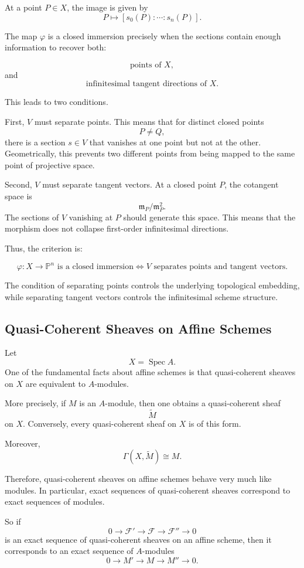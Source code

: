 \documentclass[12pt,a4paper]{article}
\theoremstyle{notespace}
\begin{document}
At a point \(P\in X\), the image is given by
\[
P\mapsto [s_0(P):\cdots:s_n(P)].
\]

The map \(\varphi\) is a closed immersion precisely when the sections contain enough information to recover both:

\[
\text{points of }X,
\]
and
\[
\text{infinitesimal tangent directions of }X.
\]

This leads to two conditions.

First, \(V\) must separate points. This means that for distinct closed points
\[
P\neq Q,
\]
there is a section \(s\in V\) that vanishes at one point but not at the other. Geometrically, this prevents two different points from being mapped to the same point of projective space.

Second, \(V\) must separate tangent vectors. At a closed point \(P\), the cotangent space is
\[
\mathfrak m_P/\mathfrak m_P^2.
\]
The sections of \(V\) vanishing at \(P\) should generate this space. This means that the morphism does not collapse first-order infinitesimal directions.

Thus, the criterion is:

\[
\boxed{
	\varphi:X\to \mathbb P^n
	\text{ is a closed immersion}
	\iff
	V \text{ separates points and tangent vectors.}
}
\]

The condition of separating points controls the underlying topological embedding, while separating tangent vectors controls the infinitesimal scheme structure.

\subsection{Quasi-Coherent Sheaves on Affine Schemes}

Let
\[
X=\operatorname{Spec}A.
\]
One of the fundamental facts about affine schemes is that quasi-coherent sheaves on \(X\) are equivalent to \(A\)-modules.

More precisely, if \(M\) is an \(A\)-module, then one obtains a quasi-coherent sheaf
\[
\widetilde M
\]
on \(X\). Conversely, every quasi-coherent sheaf on \(X\) is of this form.

Moreover,
\[
\Gamma(X,\widetilde M)\cong M.
\]

Therefore, quasi-coherent sheaves on affine schemes behave very much like modules. In particular, exact sequences of quasi-coherent sheaves correspond to exact sequences of modules.

So if
\[
0\to \mathcal F'\to \mathcal F\to \mathcal F''\to 0
\]
is an exact sequence of quasi-coherent sheaves on an affine scheme, then it corresponds to an exact sequence of \(A\)-modules
\[
0\to M'\to M\to M''\to 0.
\]
\end{document}
